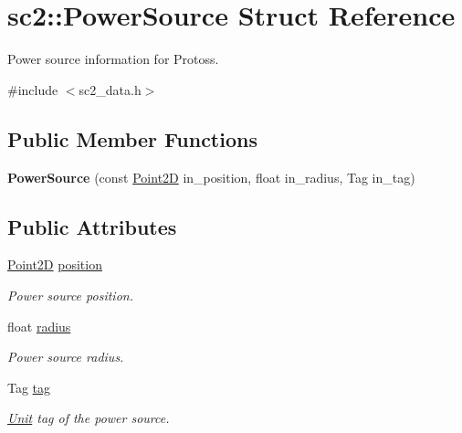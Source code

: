 \hypertarget{structsc2_1_1_power_source}{}\section{sc2\+:\+:Power\+Source Struct Reference}
\label{structsc2_1_1_power_source}


Power source information for Protoss.  




{\ttfamily \#include $<$sc2\+\_\+data.\+h$>$}

\subsection*{Public Member Functions}
\begin{DoxyCompactItemize}
\item 
\mbox{\label{structsc2_1_1_power_source_a7e7f3692959314e185b9505ddb1884b1}} 
{\bfseries Power\+Source} (const \hyperlink{structsc2_1_1_point2_d}{Point2D} in\+\_\+position, float in\+\_\+radius, Tag in\+\_\+tag)
\end{DoxyCompactItemize}
\subsection*{Public Attributes}
\begin{DoxyCompactItemize}
\item 
\mbox{\label{structsc2_1_1_power_source_acbd869abcc7f5964aca0faeb5905ee3d}} 
\hyperlink{structsc2_1_1_point2_d}{Point2D} \hyperlink{structsc2_1_1_power_source_acbd869abcc7f5964aca0faeb5905ee3d}{position}
\begin{DoxyCompactList}\small\item\em Power source position. \end{DoxyCompactList}\item 
\mbox{\label{structsc2_1_1_power_source_ab26f1606de2400d63693272a501d4d2d}} 
float \hyperlink{structsc2_1_1_power_source_ab26f1606de2400d63693272a501d4d2d}{radius}
\begin{DoxyCompactList}\small\item\em Power source radius. \end{DoxyCompactList}\item 
\mbox{\label{structsc2_1_1_power_source_a98e4c9965754bf09d2c9504ed84ccbe9}} 
Tag \hyperlink{structsc2_1_1_power_source_a98e4c9965754bf09d2c9504ed84ccbe9}{tag}
\begin{DoxyCompactList}\small\item\em \hyperlink{classsc2_1_1_unit}{Unit} tag of the power source. \end{DoxyCompactList}\end{DoxyCompactItemize}


